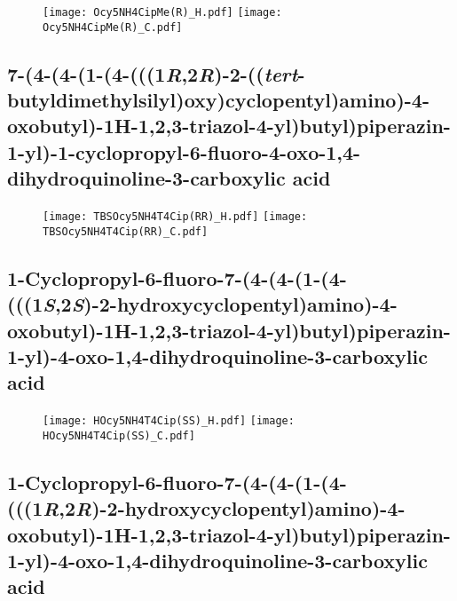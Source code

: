 \begin{figure}[H]
	\centering
		\texttt{[image: Ocy5NH4CipMe(R)\_H.pdf]}
		\texttt{[image: Ocy5NH4CipMe(R)\_C.pdf]}
\end{figure}

\subsection{7\hyp{}(4\hyp{}(4\hyp{}(1\hyp{}(4\hyp{}(((1\textit{R},2\textit{R})\hyp{}2\hyp{}((\textit{tert}\hyp{}butyldimethylsilyl)oxy)cyclopentyl)amino)\hyp{}4\hyp{}oxobutyl)\hyp{}1H\hyp{}1,2,3\hyp{}triazol\hyp{}4\hyp{}yl)butyl)piperazin\hyp{}1\hyp{}yl)\hyp{}1\hyp{}cyclopropyl\hyp{}6\hyp{}fluoro\hyp{}4\hyp{}oxo\hyp{}1,4\hyp{}dihydroquinoline\hyp{}3\hyp{}carboxylic acid }

\begin{figure}[H]
	\centering
		\texttt{[image: TBSOcy5NH4T4Cip(RR)\_H.pdf]}
		\texttt{[image: TBSOcy5NH4T4Cip(RR)\_C.pdf]}
\end{figure}

\subsection{1\hyp{}Cyclopropyl\hyp{}6\hyp{}fluoro\hyp{}7\hyp{}(4\hyp{}(4\hyp{}(1\hyp{}(4\hyp{}(((1\textit{S},2\textit{S})\hyp{}2\hyp{}hydroxycyclopentyl)amino)\hyp{}4\hyp{}oxobutyl)\hyp{}1H\hyp{}1,2,3\hyp{}triazol\hyp{}4\hyp{}yl)butyl)piperazin\hyp{}1\hyp{}yl)\hyp{}4\hyp{}oxo\hyp{}1,4\hyp{}dihydroquinoline\hyp{}3\hyp{}carboxylic acid }

\begin{figure}[H]
	\centering
		\texttt{[image: HOcy5NH4T4Cip(SS)\_H.pdf]}
		\texttt{[image: HOcy5NH4T4Cip(SS)\_C.pdf]}
\end{figure}

\subsection{1\hyp{}Cyclopropyl\hyp{}6\hyp{}fluoro\hyp{}7\hyp{}(4\hyp{}(4\hyp{}(1\hyp{}(4\hyp{}(((1\textit{R},2\textit{R})\hyp{}2\hyp{}hydroxycyclopentyl)amino)\hyp{}4\hyp{}oxobutyl)\hyp{}1H\hyp{}1,2,3\hyp{}triazol\hyp{}4\hyp{}yl)butyl)piperazin\hyp{}1\hyp{}yl)\hyp{}4\hyp{}oxo\hyp{}1,4\hyp{}dihydroquinoline\hyp{}3\hyp{}carboxylic acid }

